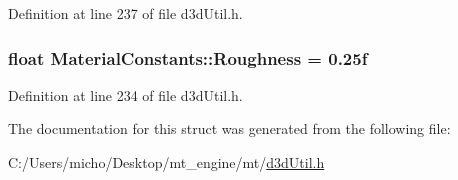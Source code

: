 Definition at line 237 of file d3d\+Util.\+h.

\subsubsection[{\texorpdfstring{Roughness}{Roughness}}]{\setlength{\rightskip}{0pt plus 5cm}float Material\+Constants\+::\+Roughness = 0.\+25f}\hypertarget{struct_material_constants_ab931870a28dc4f2afdf7d6f565d06659_ab931870a28dc4f2afdf7d6f565d06659}{}\label{struct_material_constants_ab931870a28dc4f2afdf7d6f565d06659_ab931870a28dc4f2afdf7d6f565d06659}


Definition at line 234 of file d3d\+Util.\+h.



The documentation for this struct was generated from the following file\+:\begin{DoxyCompactItemize}
\item 
C\+:/\+Users/micho/\+Desktop/mt\+\_\+engine/mt/\hyperlink{d3d_util_8h}{d3d\+Util.\+h}\end{DoxyCompactItemize}
